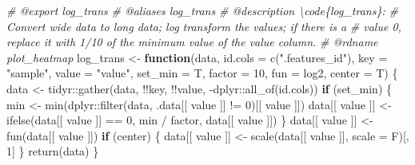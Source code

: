 \documentclass[
]{article}
\newenvironment{Shaded}{\begin{snugshade}}{\end{snugshade}}
\newcommand{\AttributeTok}[1]{\textcolor[rgb]{0.77,0.63,0.00}{#1}}
\newcommand{\CommentTok}[1]{\textcolor[rgb]{0.56,0.35,0.01}{\textit{#1}}}
\newcommand{\ControlFlowTok}[1]{\textcolor[rgb]{0.13,0.29,0.53}{\textbf{#1}}}
\newcommand{\DecValTok}[1]{\textcolor[rgb]{0.00,0.00,0.81}{#1}}
\newcommand{\FunctionTok}[1]{\textcolor[rgb]{0.00,0.00,0.00}{#1}}
\newcommand{\NormalTok}[1]{#1}
\newcommand{\OtherTok}[1]{\textcolor[rgb]{0.56,0.35,0.01}{#1}}
\newcommand{\SpecialCharTok}[1]{\textcolor[rgb]{0.00,0.00,0.00}{#1}}
\newcommand{\StringTok}[1]{\textcolor[rgb]{0.31,0.60,0.02}{#1}}
\begin{document}
\begin{Shaded}
\begin{Highlighting}[]
\CommentTok{\#\textquotesingle{} @export log\_trans}
\CommentTok{\#\textquotesingle{} @aliases log\_trans}
\CommentTok{\#\textquotesingle{} @description \textbackslash{}code\{log\_trans\}:}
\CommentTok{\#\textquotesingle{} Convert wide data to long data; log transform the values; if there is a}
\CommentTok{\#\textquotesingle{} value 0, replace it with 1/10 of the minimum value of the value column.}
\CommentTok{\#\textquotesingle{} @rdname plot\_heatmap}
\NormalTok{log\_trans }\OtherTok{\textless{}{-}} \ControlFlowTok{function}\NormalTok{(data, }\AttributeTok{id.cols =} \FunctionTok{c}\NormalTok{(}\StringTok{".features\_id"}\NormalTok{),}
  \AttributeTok{key =} \StringTok{"sample"}\NormalTok{, }\AttributeTok{value =} \StringTok{"value"}\NormalTok{,}
  \AttributeTok{set\_min =}\NormalTok{ T, }\AttributeTok{factor =} \DecValTok{10}\NormalTok{, }\AttributeTok{fun =}\NormalTok{ log2, }\AttributeTok{center =}\NormalTok{ T)}
\NormalTok{\{}
\NormalTok{  data }\OtherTok{\textless{}{-}}\NormalTok{ tidyr}\SpecialCharTok{::}\FunctionTok{gather}\NormalTok{(data, }\SpecialCharTok{!!}\NormalTok{key, }\SpecialCharTok{!!}\NormalTok{value, }\SpecialCharTok{{-}}\NormalTok{dplyr}\SpecialCharTok{::}\FunctionTok{all\_of}\NormalTok{(id.cols))}
  \ControlFlowTok{if}\NormalTok{ (set\_min) \{}
\NormalTok{    min }\OtherTok{\textless{}{-}} \FunctionTok{min}\NormalTok{(dplyr}\SpecialCharTok{::}\FunctionTok{filter}\NormalTok{(data, .data[[ value ]] }\SpecialCharTok{!=} \DecValTok{0}\NormalTok{)[[ value ]])}
\NormalTok{    data[[ value ]] }\OtherTok{\textless{}{-}} \FunctionTok{ifelse}\NormalTok{(data[[ value ]] }\SpecialCharTok{==} \DecValTok{0}\NormalTok{, min }\SpecialCharTok{/}\NormalTok{ factor, data[[ value ]])}
\NormalTok{  \}}
\NormalTok{  data[[ value ]] }\OtherTok{\textless{}{-}} \FunctionTok{fun}\NormalTok{(data[[ value ]])}
  \ControlFlowTok{if}\NormalTok{ (center) \{}
\NormalTok{    data[[ value ]] }\OtherTok{\textless{}{-}} \FunctionTok{scale}\NormalTok{(data[[ value ]], }\AttributeTok{scale =}\NormalTok{ F)[, }\DecValTok{1}\NormalTok{]}
\NormalTok{  \}}
  \FunctionTok{return}\NormalTok{(data)}
\NormalTok{\}}


\end{Highlighting}
\end{Shaded}
\end{document}
